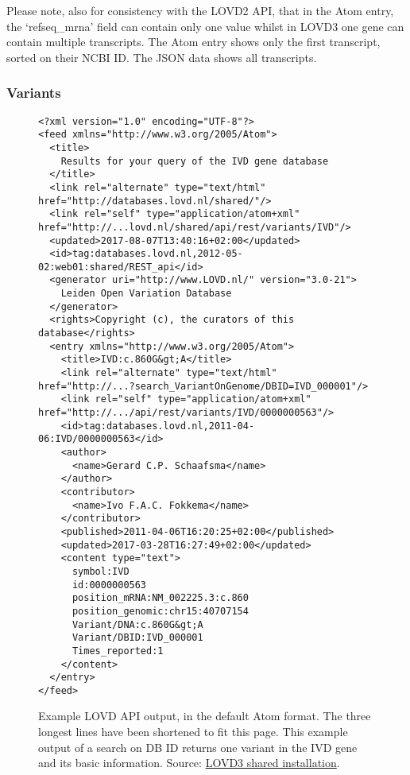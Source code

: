 Please note, also for consistency with the LOVD2 API, that in the Atom entry, the `refseq\_mrna' field can
 contain only one value whilst in LOVD3 one gene can contain multiple transcripts.
The Atom entry shows only the first transcript, sorted on their NCBI ID.
The JSON data shows all transcripts.
\clearpage

\subsubsection{Variants}
\begin{figure}[ht]
  \begin{shaded}
    \scriptsize
    \begin{verbatim}
<?xml version="1.0" encoding="UTF-8"?>
<feed xmlns="http://www.w3.org/2005/Atom">
  <title>
    Results for your query of the IVD gene database
  </title>
  <link rel="alternate" type="text/html" href="http://databases.lovd.nl/shared/"/>
  <link rel="self" type="application/atom+xml" href="http://...lovd.nl/shared/api/rest/variants/IVD"/>
  <updated>2017-08-07T13:40:16+02:00</updated>
  <id>tag:databases.lovd.nl,2012-05-02:web01:shared/REST_api</id>
  <generator uri="http://www.LOVD.nl/" version="3.0-21">
    Leiden Open Variation Database
  </generator>
  <rights>Copyright (c), the curators of this database</rights>
  <entry xmlns="http://www.w3.org/2005/Atom">
    <title>IVD:c.860G&gt;A</title>
    <link rel="alternate" type="text/html" href="http://...?search_VariantOnGenome/DBID=IVD_000001"/>
    <link rel="self" type="application/atom+xml" href="http://.../api/rest/variants/IVD/0000000563"/>
    <id>tag:databases.lovd.nl,2011-04-06:IVD/0000000563</id>
    <author>
      <name>Gerard C.P. Schaafsma</name>
    </author>
    <contributor>
      <name>Ivo F.A.C. Fokkema</name>
    </contributor>
    <published>2011-04-06T16:20:25+02:00</published>
    <updated>2017-03-28T16:27:49+02:00</updated>
    <content type="text">
      symbol:IVD
      id:0000000563
      position_mRNA:NM_002225.3:c.860
      position_genomic:chr15:40707154
      Variant/DNA:c.860G&gt;A
      Variant/DBID:IVD_000001
      Times_reported:1
    </content>
  </entry>
</feed>
    \end{verbatim}
  \caption{%
    Example LOVD API output, in the default Atom format.
    The three longest lines have been shortened to fit this page.
    This example output of a search on DB ID returns one variant in the IVD gene and its basic information.
    Source: \href{http://databases.lovd.nl/shared/api/rest/variants/IVD?search_Variant/DBID=IVD_000001}
     {LOVD3 shared installation}.}
  \end{shaded}
\end{figure}

